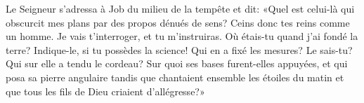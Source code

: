 Le Seigneur s’adressa à Job du milieu de la tempête et dit:
	«Quel est celui-là qui obscurcit mes plans par des propos dénués de sens?
Ceins donc tes reins comme un homme.
	Je vais t’interroger, et tu m’instruiras.
Où étais-tu quand j’ai fondé la terre?
	Indique-le, si tu possèdes la science!
Qui en a fixé les mesures? Le sais-tu?
Qui sur elle a tendu le cordeau?
Sur quoi ses bases furent-elles appuyées, et qui posa sa pierre angulaire
	tandis que chantaient ensemble les étoiles du matin
	et que tous les fils de Dieu criaient d’allégresse?»
